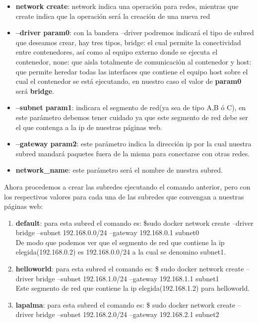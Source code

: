 \documentclass[10pt,letterpaper]{article}
\begin{document}
\begin{enumerate}
\begin{itemize}
\item \textbf{network create}: network indica una operaci\'on para redes, mientras que create indica que la operaci\'on ser\'a la creaci\'on de una nueva red
\item \textbf{--driver param0}: con la bandera --driver podremos indicar\'a el tipo de subred que deseamos crear, hay tres tipos, bridge: el cual permite la conectividad entre contenedores, as\'i como al equipo externo donde se ejecuta el contenedor, none: que aisla totalmente de comunicaci\'on al contenedor y host: que permite heredar todas las interfaces que contiene el equipo host sobre el cual el contenedor se est\'a ejecutando, en nuestro caso el valor de \textbf{param0} ser\'a \textbf{bridge}.
\item \textbf{--subnet param1}: indicara el segmento de red(ya sea de tipo A,B \'o C), en este par\'ametro debemos tener cuidado ya que este segmento de red debe ser el que contenga a la ip de nuestras p\'aginas web.
\item \textbf{--gateway param2}: este par\'ametro indica la direcci\'on ip por la cual nuestra subred mandar\'a paquetes fuera de la misma para conectarse con otras redes.
\item \textbf{network\_name}: este par\'ametro ser\'a el nombre de nuestra subred.
\end{itemize}

Ahora procedemos a crear las subredes ejecutando el comando anterior, pero con los respectivos valores para cada una de las subredes que convengan a nuestras p\'aginas web:
\begin{enumerate}
\item \textbf{default}: para esta subred el comando es: \$sudo docker network create --driver bridge --subnet 192.168.0.0/24 --gateway 192.168.0.1 subnet0 \\

De modo que podemos ver que el segmento de red que contiene la ip elegida(192.168.0.2) es 192.168.0.0/24 a la cual se denomino subnet1.

\item \textbf{helloworld}: para esta subred el comando es: \$ sudo docker network create --driver bridge --subnet 192.168.1.0/24 --gateway 192.168.1.1 subnet1 \\

Este segmento de red que contiene la ip elegida(192.168.1.2) para helloworld.

\item \textbf{lapalma}: para esta subred el comando es: \$ sudo docker network create --driver bridge --subnet 192.168.2.0/24 --gateway 192.168.2.1 subnet2 \\


\end{enumerate}
\end{enumerate}
\end{document}
